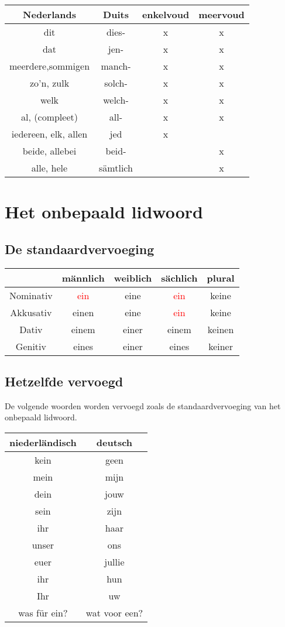 \documentclass[main.tex]{subfiles}
\begin{document}
\begin{tabular}{|c|c|c|c|}
\hline 
\rowcolor{gray}
Nederlands & Duits & enkelvoud & meervoud \\ 
\hline 
dit & dies- & x & x \\ 
\hline 
dat & jen- & x & x \\ 
\hline 
meerdere,sommigen & manch- & x & x \\ 
\hline 
zo'n, zulk & solch- & x & x \\ 
\hline 
welk & welch- & x & x \\ 
\hline 
al, (compleet) & all- & x & x \\ 
\hline 
iedereen, elk, allen & jed & x &  \\ 
\hline 
beide, allebei & beid- &  & x \\ 
\hline 
alle, hele & sämtlich &  & x \\ 
\hline 
\end{tabular} 
\section{Het onbepaald lidwoord}
\subsection{De standaardvervoeging}

\begin{tabular}{|c|c|c|c|c|}
\hline 
\rowcolor{gray}
& männlich & weiblich & sächlich & plural \\ 
\hline 
\cellcolor[gray]{0.8}Nominativ & \textcolor{red}{ein} & eine & \textcolor{red}{ein} & keine \\ 
\hline 
\cellcolor[gray]{0.8}Akkusativ & einen & eine & \textcolor{red}{ein} & keine \\ 
\hline 
\cellcolor[gray]{0.8}Dativ & einem & einer & einem & keinen \\ 
\hline 
\cellcolor[gray]{0.8}Genitiv & eines & einer & eines & keiner \\ 
\hline 
\end{tabular} 

\subsection{Hetzelfde vervoegd}
De volgende woorden worden vervoegd zoals de standaardvervoeging van het onbepaald lidwoord.

\begin{tabular}{|c|c|}
\hline 
\rowcolor{gray}
niederländisch & deutsch \\ 
\hline 
kein & geen \\ 
\hline 
mein & mijn \\ 
\hline 
dein & jouw \\ 
\hline 
sein & zijn \\ 
\hline 
ihr & haar \\ 
\hline 
unser & ons \\ 
\hline 
euer & jullie \\ 
\hline 
ihr & hun \\ 
\hline 
Ihr & uw \\ 
\hline 
was für ein? & wat voor een? \\ 
\hline 
\end{tabular} 
\end{document}
